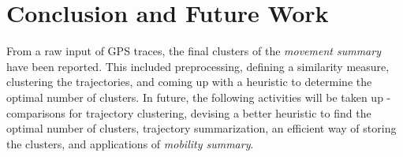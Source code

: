 \section{Conclusion and Future Work}

From a raw input of GPS traces, the final clusters of the \emph{movement summary} have been reported. This included preprocessing, defining a similarity measure, clustering the trajectories, and coming up with a heuristic to determine the optimal number of clusters. 
In future, the following activities will be taken up - comparisons for trajectory clustering, devising a better heuristic to find the optimal number of clusters, trajectory summarization, an efficient way of storing the clusters, and applications of \emph{mobility summary}.